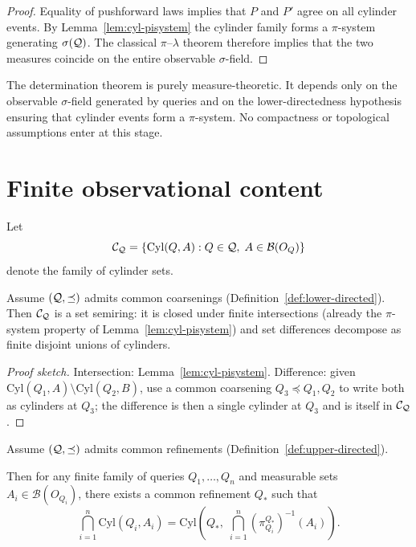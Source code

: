 \begin{proof}
Equality of pushforward laws implies that $P$ and $P'$ agree on all
cylinder events.
By Lemma~\ref{lem:cyl-pisystem} the cylinder family forms a $\pi$-system generating
$\sigma(\mathcal{Q})$.
The classical $\pi$--$\lambda$ theorem therefore implies that the two
measures coincide on the entire observable $\sigma$-field.
\end{proof}

\begin{remark}
The determination theorem is purely measure-theoretic.  It depends
only on the observable $\sigma$-field generated by queries and on
the lower-directedness hypothesis ensuring that cylinder events form
a $\pi$-system.  No compactness or topological assumptions enter
at this stage.
\end{remark}

\section{Finite observational content}

\begin{definition}
Let
\[
\mathcal{C}_{\mathcal{Q}}
=
\{\mathrm{Cyl}(Q,A): Q\in\mathcal{Q},\;A\in\mathcal B(O_Q)\}
\]
denote the family of cylinder sets.
\end{definition}

\begin{lemma}
\label{lem:cyl-semiring}
Assume $(\mathcal{Q},\preceq)$ admits common coarsenings
(Definition~\ref{def:lower-directed}).
Then $\mathcal{C}_{\mathcal{Q}}$ is a set semiring: it is closed under finite
intersections (already the $\pi$-system property of
Lemma~\ref{lem:cyl-pisystem}) and set differences decompose as finite
disjoint unions of cylinders.
\end{lemma}

\begin{proof}[Proof sketch]
Intersection: Lemma~\ref{lem:cyl-pisystem}.
Difference: given $\mathrm{Cyl}(Q_1,A)\setminus\mathrm{Cyl}(Q_2,B)$,
use a common coarsening $Q_3 \preceq Q_1, Q_2$ to write both as
cylinders at $Q_3$; the difference is then a single cylinder at $Q_3$
and is itself in $\mathcal{C}_{\mathcal{Q}}$.
\end{proof}

\begin{lemma}
\label{lem:finite-cylinder}
Assume $(\mathcal{Q},\preceq)$ admits common refinements
(Definition~\ref{def:upper-directed}).

Then for any finite family of queries $Q_1,\ldots,Q_n$ and measurable
sets $A_i\in\mathcal B(O_{Q_i})$, there exists a common refinement
$Q_*$ such that
\[
\bigcap_{i=1}^n \mathrm{Cyl}(Q_i,A_i)
=
\mathrm{Cyl}\!\left(Q_*,\;\bigcap_{i=1}^n (\pi^{Q_*}_{Q_i})^{-1}(A_i)\right).
\]
\end{lemma}

